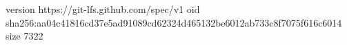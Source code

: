 version https://git-lfs.github.com/spec/v1
oid sha256:aa04c41816cd37e5ad91089cd62324d465132be6012ab733c8f7075f616c6014
size 7322
